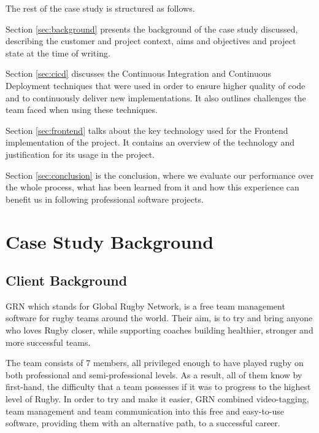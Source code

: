 \documentclass{l3proj}
\begin{document}
The rest of the case study is structured as follows.

Section \ref{sec:background} presents the background of the case study discussed, describing the customer and project context, aims and objectives and project state at the time of writing.

Section \ref{sec:cicd} discusses the Continuous Integration and Continuous Deployment techniques that were used in order to ensure higher quality of code and to continuously deliver new implementations. It also outlines challenges the team faced when using these techniques.

Section \ref{sec:frontend} talks about the key technology used for the Frontend implementation of the project. It contains an overview of the technology and justification for its usage in the project.

Section \ref{sec:conclusion} is the conclusion, where we evaluate our performance over the whole process, what has been learned from it and how this experience can benefit us in following professional software projects.


\newpage
\section{Case Study Background}

\subsection{Client Background}

GRN which stands for Global Rugby Network, is a free team management software
for rugby teams around the world. Their aim, is to try and bring anyone who loves
Rugby closer, while supporting coaches building healthier, stronger and more
successful teams.

The team consists of 7 members, all privileged enough to have played rugby on both
professional and semi-professional levels. As a result, all of them know by first-hand, the
difficulty that a team possesses if it was to progress to the highest level of Rugby. In
order to try and make it easier, GRN combined video-tagging, team management and team
communication into this free and easy-to-use software, providing them with an alternative
path, to a successful career.
\end{document}
